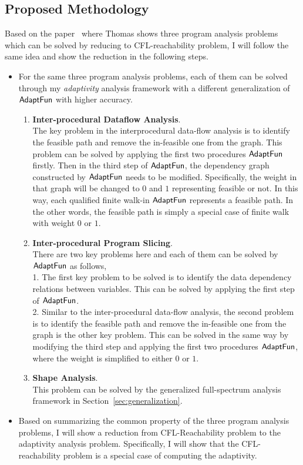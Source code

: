 \subsection{Proposed Methodology}
\label{subsec:cfl-methodology}
Based on the paper~\cite{Reps98} where Thomas shows 
three program analysis problems 
which can be solved by reducing to CFL-reachability problem, I will follow the same idea and show the reduction
in the following steps.
\begin{itemize}
 \item For the same three program analysis problems, each of them 
 can be solved through my \emph{adaptivity} analysis framework with 
 a different generalization of $\textsf{AdaptFun}$ with higher accuracy.
 \begin{enumerate}
 \item \textbf{Inter-procedural Dataflow Analysis}.
 \\
 The key problem in the interprocedural data-flow analysis is to identify the feasible path and remove 
 the in-feasible one from the graph.
 This problem can be solved by applying the first two procedures $\textsf{AdaptFun}$ firstly.
 Then in the third step of  $\textsf{AdaptFun}$, the dependency graph constructed by $\textsf{AdaptFun}$ needs to be modified.
 Specifically, the weight in that graph will be changed to $0$ and $1$ 
 representing feasible or not. 
 In this way, each qualified finite walk-in 
 $\textsf{AdaptFun}$ represents a feasible path.
In the other words, the feasible path is simply a special case of finite walk 
 with weight $0$ or $1$.
 \item \textbf{Inter-procedural Program Slicing}.
 \\
 There are two key problems here and each of them can be solved by $\textsf{AdaptFun}$ as follows,
 \\ 
 1. The first key problem to be solved is to identify the data dependency relations between variables. 
 This can be solved by applying the first step of $\textsf{AdaptFun}$.
 \\
 2. Similar to the inter-procedural data-flow analysis, 
 the second problem is to identify the feasible path and remove 
 the in-feasible one from the graph is the other key problem. 
 This can be solved in the same way by modifying the third step and applying the first two procedures $\textsf{AdaptFun}$,
 where the weight is simplified to either $0$ or $1$.
 \item \textbf{Shape Analysis}.
 \\
 This problem can be solved by the generalized full-spectrum analysis framework in Section~\ref{sec:generalization}.
 \end{enumerate}
 \item Based on summarizing the common property of the three program analysis problems,
 I will show a reduction from CFL-Reachability problem to the 
 adaptivity analysis problem.
 Specifically, I will show that the CFL-reachability problem is a special case of 
 computing the adaptivity. 
\end{itemize}
